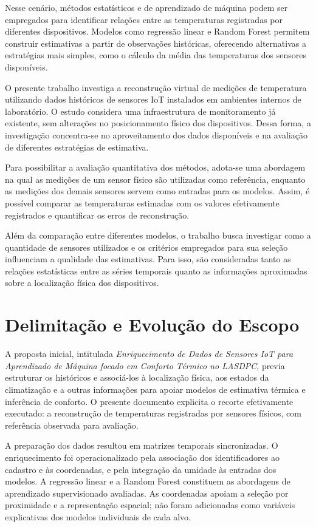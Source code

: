 Nesse cenário, métodos estatísticos e de aprendizado de máquina podem ser empregados para identificar relações entre as temperaturas registradas por diferentes dispositivos. Modelos como regressão linear e Random Forest permitem construir estimativas a partir de observações históricas, oferecendo alternativas a estratégias mais simples, como o cálculo da média das temperaturas dos sensores disponíveis.

O presente trabalho investiga a reconstrução virtual de medições de temperatura utilizando dados históricos de sensores IoT instalados em ambientes internos de laboratório. O estudo considera uma infraestrutura de monitoramento já existente, sem alterações no posicionamento físico dos dispositivos. Dessa forma, a investigação concentra-se no aproveitamento dos dados disponíveis e na avaliação de diferentes estratégias de estimativa.

Para possibilitar a avaliação quantitativa dos métodos, adota-se uma abordagem na qual as medições de um sensor físico são utilizadas como referência, enquanto as medições dos demais sensores servem como entradas para os modelos. Assim, é possível comparar as temperaturas estimadas com os valores efetivamente registrados e quantificar os erros de reconstrução.

Além da comparação entre diferentes modelos, o trabalho busca investigar como a quantidade de sensores utilizados e os critérios empregados para sua seleção influenciam a qualidade das estimativas. Para isso, são consideradas tanto as relações estatísticas entre as séries temporais quanto as informações aproximadas sobre a localização física dos dispositivos.

\section{Delimitação e Evolução do Escopo}
\label{sec:evolucao_escopo}

A proposta inicial, intitulada \textit{Enriquecimento de Dados de Sensores
IoT para Aprendizado de Máquina focado em Conforto Térmico no LASDPC},
previa estruturar os históricos e associá-los à localização física,
aos estados da climatização e a outras informações para apoiar modelos
de estimativa térmica e inferência de conforto. O presente documento
explicita o recorte efetivamente executado: a reconstrução de temperaturas
registradas por sensores físicos, com referência observada para avaliação.

A preparação dos dados resultou em matrizes temporais sincronizadas.
O enriquecimento foi operacionalizado pela associação dos identificadores
ao cadastro e às coordenadas, e pela integração da umidade às entradas
dos modelos. A regressão linear e a Random Forest constituem as abordagens
de aprendizado supervisionado avaliadas. As coordenadas apoiam a seleção
por proximidade e a representação espacial; não foram adicionadas como
variáveis explicativas dos modelos individuais de cada alvo.


